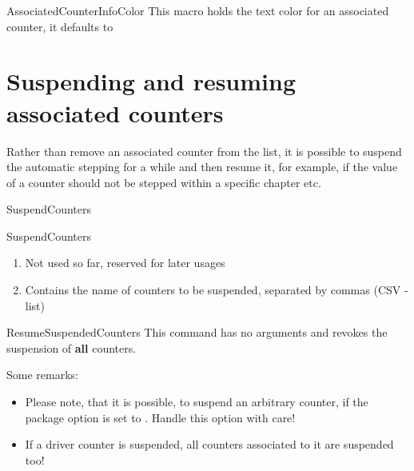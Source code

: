 \documentclass[12pt,paper=a4]{article}
\begin{document}
\begin{docCommand}{AssociatedCounterInfoColor}{}
This macro holds the text color for an associated counter, it defaults to \meta{\textcolor{\AssociatedCounterInfoColor}{\expandafter\AssociatedCounterInfoColor}}%
\end{docCommand}

\begin{dispExample}
\end{dispExample}



\section{Suspending and resuming associated counters}\label{section::suspendedresumedcounters}

Rather than remove an associated counter from the list, it is possible to suspend the automatic stepping for a while and then resume it, for example, if the value of a counter should not be stepped within a specific chapter etc. 

\begin{docCommand}{SuspendCounters}{}%
\begin{docCommandArgs}{SuspendCounters}%

\begin{enumerate}[label={\textcolor{blue}{\#\arabic*}}]
\item {}%

  Not used so far, reserved for later usages

\item {}%

  Contains the name of counters to be suspended, separated by commas (CSV - list)
\end{enumerate}

\end{docCommandArgs}
\end{docCommand}%

\begin{docCommand}{ResumeSuspendedCounters}{}
  This command has no arguments and revokes the suspension of \textbf{all} counters.
\end{docCommand}


Some remarks:

\begin{itemize}
\item 
Please note, that it is possible, to suspend an arbitrary counter, if the package option  is set to . Handle this option with care!
\item If a driver counter is suspended, all counters associated to it are suspended too!
\end{itemize}%
\end{document}
